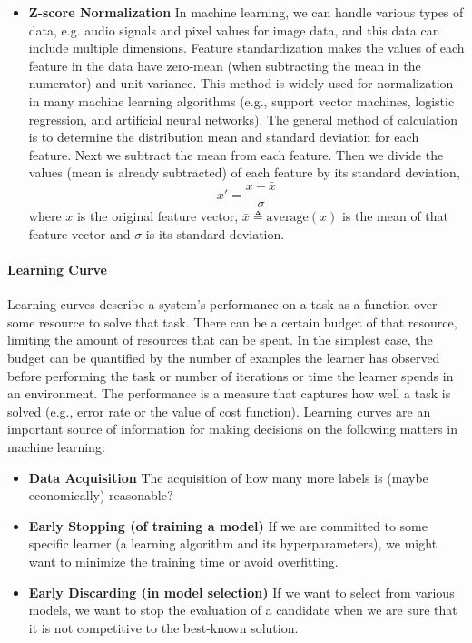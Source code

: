 \documentclass[12pt, twoside]{article}
\begin{document}
\begin{multicols*}{2}
\begin{itemize}
				\item \textbf{Z-score Normalization} In machine learning, we can handle various types of data, e.g. audio signals and pixel values for image data, and this data can include multiple dimensions. Feature standardization makes the values of each feature in the data have zero-mean (when subtracting the mean in the numerator) and unit-variance. This method is widely used for normalization in many machine learning algorithms (e.g., support vector machines, logistic regression, and artificial neural networks). The general method of calculation is to determine the distribution mean and standard deviation for each feature. Next we subtract the mean from each feature. Then we divide the values (mean is already subtracted) of each feature by its standard deviation,
				$$ x'=\frac{x-\bar{x}}{\sigma} $$
				where $x$ is the original feature vector, $\bar{x}\triangleq\text{average}(x)$ is the mean of that feature vector and $\sigma$ is its standard deviation.
			\end{itemize}
			
			\paragraph{Learning Curve} Learning curves describe a system’s performance on a task as a function over some resource to solve that task. There can be a certain budget of that resource, limiting the amount of resources that can be spent. In the simplest case, the budget can be quantified by the number of examples the learner has observed before performing the task or number of iterations or time the learner spends in an environment. The performance is a measure that captures how well a task is solved (e.g., error rate or the value of cost function). Learning curves are an important source of information for making decisions on the following matters in machine learning\cite{mohr2022learning}:
			\begin{itemize}
				\item \textbf{Data Acquisition} The acquisition of how many more labels is (maybe economically) reasonable?
				
				\item \textbf{Early Stopping (of training a model)} If we are committed to some specific learner (a learning algorithm and its hyperparameters), we might want to minimize the training time or avoid overfitting.
				
				\item \textbf{Early Discarding (in model selection)} If we want to select from various models, we want to stop the evaluation of a candidate when we are sure that it is not competitive to the best-known solution.
			\end{itemize}
			

\end{multicols*}
\end{document}
